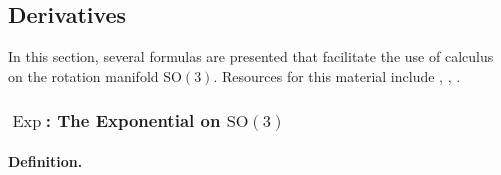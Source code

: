 \hypertarget{the-exponential}{%
\subsection{Derivatives}\label{the-exponential}}

In this section, several formulas are presented that facilitate the use of calculus on the rotation manifold \(\mathrm{SO}(3)\). 
Resources for this material include \cite{barfoot2017state}, \cite{hertzberg2008framework}, \cite{iserles2000liegroup}.

\subsubsection{\texorpdfstring{\(\operatorname{Exp}\): The Exponential
on
\(\mathrm{SO}(3)\)}{Exp: The Exponential on SO(3)}}\label{sec:exp-so3}
%
\paragraph*{Definition.}

